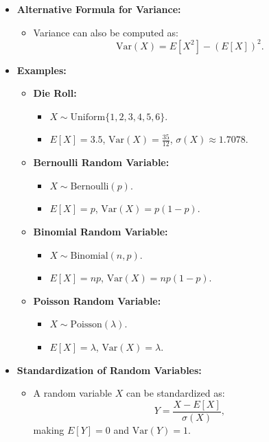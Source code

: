 \documentclass{article}
\begin{document}
\begin{itemize}
  \item \textbf{Alternative Formula for Variance:}
    \begin{itemize}
      \item Variance can also be computed as:
        \[
          \text{Var}(X) = E[X^2] - (E[X])^2.
        \]
    \end{itemize}

  \item \textbf{Examples:}
    \begin{itemize}
      \item \textbf{Die Roll:}
        \begin{itemize}
          \item $X \sim \text{Uniform}\{1, 2, 3, 4, 5, 6\}$.
          \item $E[X] = 3.5$, $\text{Var}(X) = \frac{35}{12}$, $\sigma(X) \approx 1.7078$.
        \end{itemize}

      \item \textbf{Bernoulli Random Variable:}
        \begin{itemize}
          \item $X \sim \text{Bernoulli}(p)$.
          \item $E[X] = p$, $\text{Var}(X) = p(1 - p)$.
        \end{itemize}

      \item \textbf{Binomial Random Variable:}
        \begin{itemize}
          \item $X \sim \text{Binomial}(n, p)$.
          \item $E[X] = np$, $\text{Var}(X) = np(1 - p)$.
        \end{itemize}

      \item \textbf{Poisson Random Variable:}
        \begin{itemize}
          \item $X \sim \text{Poisson}(\lambda)$.
          \item $E[X] = \lambda$, $\text{Var}(X) = \lambda$.
        \end{itemize}
    \end{itemize}

  \item \textbf{Standardization of Random Variables:}
    \begin{itemize}
      \item A random variable $X$ can be standardized as:
        \[
          Y = \frac{X - E[X]}{\sigma(X)},
        \]
        making $E[Y] = 0$ and $\text{Var}(Y) = 1$.
    \end{itemize}


\end{itemize}
\end{document}
